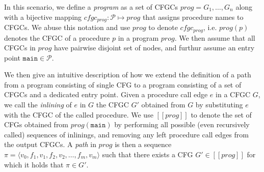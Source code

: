 In this scenario, we define a \emph{program} as a set of CFGCs $prog = {G_1, \dots, G_n}$ along with a bijective mapping $cfgc_{prog} : \mathcal{P} \mapsto prog$ that assigns procedure names to CFGCs. We abuse this notation and use $prog$ to denote $cfgc_{prog}$, i.e. $prog(p)$ denotes the CFGC of a procedure $p$ in a program $prog$. We then assume that all CFGCs in $prog$ have pairwise disjoint set of nodes, and furthur assume an entry point $\mathtt{main} \in \mathcal{P}$. 

We then give an intuitive description of how we extend the definition of a path from a program consisting of single CFG to a program consisting of a set of CFGCs and a dedicated entry point. Given a procedure call edge $e$ in a CFGC $G$, we call the \emph{inlining} of $e$ in $G$ the CFGC $G'$ obtained from $G$ by substituting $e$ with the CFGC of the called procedure. We use $[\![prog]\!]$ to denote the set of CFGs obtained from $prog(\mathtt{main})$ by performing all possible (even recursively called) sequences of inlinings, and removing any left procedure call edges from the output CFGCs. A \emph{path} in $prog$ is then a sequence $\pi = \langle v_0, f_1, v_1, f_2, v_2, \dots , f_m, v_m \rangle$ such that there exists a CFG $G' \in [\![prog]\!]$ for which it holds that $\pi \in G'$. 